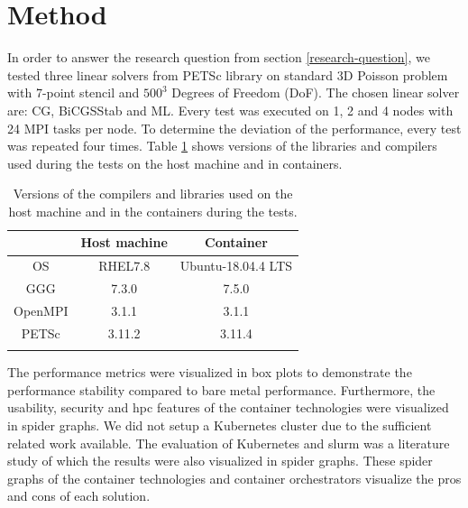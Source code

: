 \documentclass[conference]{IEEEtran}
\begin{document}



\section{Method}
In order to answer the research question from section \ref{research-question}, we tested three linear solvers from PETSc library \cite{PETSc2020overview} on standard 3D Poisson problem with 7-point stencil and $500^3$ Degrees of Freedom (DoF). The chosen linear solver are: CG, BiCGSStab and ML. Every test was executed on 1, 2 and 4 nodes with 24 MPI tasks per node. To determine the deviation of the performance, every test was repeated four times. Table \ref{tab:lib_verions} shows versions of the libraries and compilers used during the tests on the host machine and in containers.
\begin{table}[]
    \centering
    \begin{tabular}{c c c}
        \hline
                & Host machine & Container \\ \hline
        OS      & RHEL7.8      & Ubuntu-18.04.4 LTS \\
        GGG     & 7.3.0        & 7.5.0 \\
        OpenMPI & 3.1.1        & 3.1.1 \\
        PETSc   & 3.11.2       & 3.11.4 \\ \\
    \end{tabular}
    \caption{Versions of the compilers and libraries used on the host machine and in the containers during the tests.}
    \label{tab:lib_verions}
\end{table}

The performance metrics were visualized in box plots to demonstrate the performance stability compared to bare metal performance. Furthermore, the usability, security and \gls{hpc} features of the container technologies were visualized in spider graphs. We did not setup a Kubernetes cluster due to the sufficient related work available. The evaluation of Kubernetes and \gls{slurm} was a literature study of which the results were also visualized in spider graphs. These spider graphs of the container technologies and container orchestrators visualize the pros and cons of each solution. 
\end{document}
